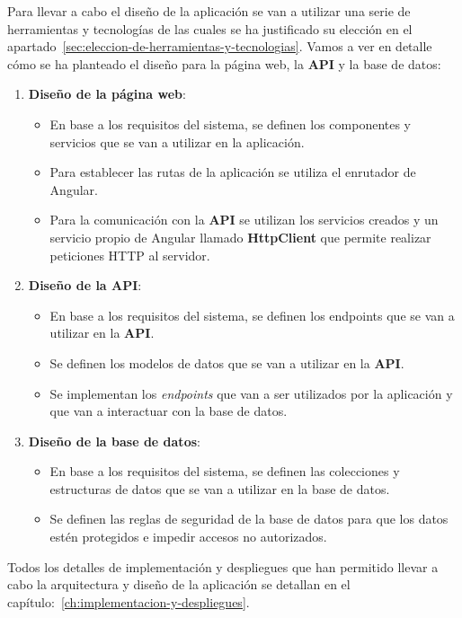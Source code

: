 Para llevar a cabo el diseño de la aplicación se van a utilizar una serie de herramientas y tecnologías de las cuales
se ha justificado su elección en el apartado~\ref{sec:eleccion-de-herramientas-y-tecnologias}. Vamos a ver en detalle
cómo se ha planteado el diseño para la página web, la \textbf{API} y la base de datos:

\begin{enumerate}
    \item \textbf{Diseño de la página web}:
    \begin{itemize}
        \item En base a los requisitos del sistema, se definen los componentes y servicios que se van a utilizar en la
        aplicación.
        \item Para establecer las rutas de la aplicación se utiliza el enrutador de Angular.
        \item Para la comunicación con la \textbf{API} se utilizan los servicios creados y un servicio propio de Angular llamado
        \textbf{HttpClient} que permite realizar peticiones HTTP al servidor.
    \end{itemize}
    \item \textbf{Diseño de la API}:
    \begin{itemize}
        \item En base a los requisitos del sistema, se definen los endpoints que se van a utilizar en la \textbf{API}.
        \item Se definen los modelos de datos que se van a utilizar en la \textbf{API}.
        \item Se implementan los \textit{endpoints} que van a ser utilizados por la aplicación y que van
        a interactuar con la base de datos.
    \end{itemize}
    \item \textbf{Diseño de la base de datos}:
    \begin{itemize}
        \item En base a los requisitos del sistema, se definen las colecciones y estructuras de datos que se van a utilizar
        en la base de datos.
        \item Se definen las reglas de seguridad de la base de datos para que los datos estén protegidos e impedir
        accesos no autorizados.
    \end{itemize}
\end{enumerate}

Todos los detalles de implementación y despliegues que han permitido llevar a cabo la arquitectura y diseño de la aplicación se
detallan en el capítulo:~\ref{ch:implementacion-y-despliegues}.

